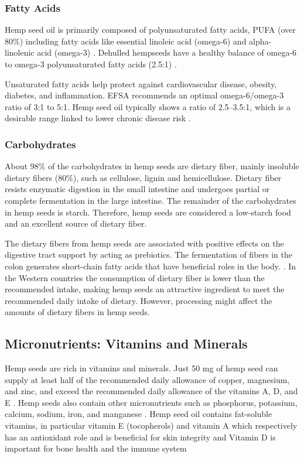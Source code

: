 \subsubsection{Fatty Acids}
Hemp seed oil is primarily composed of polyunsaturated fatty acids, PUFA (over 80\%) including fatty acids like essential linoleic acid (omega-6) and alpha-linolenic acid (omega-3) \cite*{HempBook}. Dehulled hempseeds have a healthy balance of omega-6 to omega-3 polyunsaturated fatty acids (2.5:1) \cite*{HempBook}.

\vspace{1em}
Unsaturated fatty acids help protect against cardiovascular disease, obesity, diabetes, and inflammation. EFSA recommends an optimal omega-6/omega-3 ratio of 3:1 to 5:1. Hemp seed oil typically shows a ratio of 2.5–3.5:1, which is a desirable range linked to lower chronic disease risk \cite*{montero2023hemp}.

\subsubsection{Carbohydrates}
About 98\% of the carbohydrates in hemp seeds are dietary fiber, mainly insoluble dietary fibers (80\%), such as cellulose, lignin and hemicellulose. Dietary fiber resists enzymatic digestion in the small intestine and undergoes partial or complete fermentation in the large intestine. The remainder of the carbohydrates in hemp seeds is starch. Therefore, hemp seeds are considered a low-starch food and an excellent source of dietary fiber. \cite*{montero2023hemp} 

\vspace{1em}
The dietary fibers from hemp seeds are associated with positive effects on the digestive tract support by acting as prebiotics. The fermentation of fibers in the colon generates short-chain fatty acids that have beneficial roles in the body. \cite*{aluko2017hemp}. In the Western countries the consumption of dietary fiber is lower than the recommended intake, making hemp seeds an attractive ingredient to meet the recommended daily intake of dietary. However, processing might affect the amounts of dietary fibers in hemp seeds. 

\subsection{Micronutrients: Vitamins and Minerals}
Hemp seeds are rich in vitamins and minerals. Just 50 mg of hemp seed can supply at least half of the recommended daily allowance of copper, magnesium, and zinc, and exceed the recommended daily allowance of the vitamins A, D, and E \cite*{HempBook}. Hemp seeds also contain other micronutrients such as phosphorus, potassium, calcium, sodium, iron, and manganese \cite*{HempBook}. Hemp seed oil contains fat-soluble vitamins, in particular vitamin E (tocopherols) and vitamin A which respectively has an antioxidant role and is beneficial for skin integrity and Vitamin D is important for bone health and the immune system \cite*{montero2023hemp}


